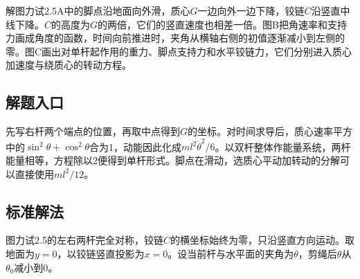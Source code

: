 \documentclass[UTF8,fontset=fandol,a4paper,11pt]{ctexart}
\begin{document}
解图力试2.5A中的脚点沿地面向外滑，质心$G$一边向外一边下降，铰链$C$沿竖直中线下降。$C$的高度为$G$的两倍，它们的竖直速度也相差一倍。图B把角速率和支持力画成角度的函数，时间向前推进时，夹角从横轴右侧的初值逐渐减小到左侧的零。图C画出对单杆起作用的重力、脚点支持力和水平铰链力，它们分别进入质心加速度与绕质心的转动方程。



\subsection*{解题入口}

先写右杆两个端点的位置，再取中点得到$G$的坐标。对时间求导后，质心速率平方中的$\sin^2\theta+\cos^2\theta$合为1，动能因此化成$ml^2\dot\theta^2/6$。以双杆整体作能量系统，两杆能量相等，方程除以2便得到单杆形式。脚点在滑动，选质心平动加转动的分解可以直接使用$ml^2/12$。



\subsection*{标准解法}


图力试2.5的左右两杆完全对称，铰链$C$的横坐标始终为零，只沿竖直方向运动。取地面为$y=0$，以铰链竖直投影为$x=0$。设当前杆与水平面的夹角为$\theta$，剪绳后$\theta$从$\theta_0$减小到0。
\end{document}
